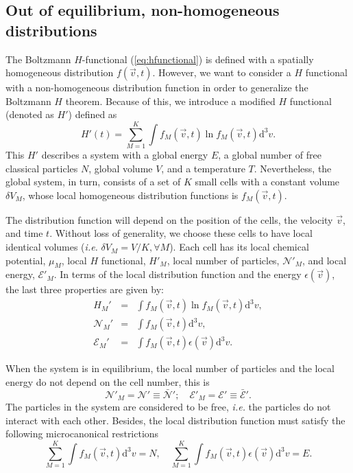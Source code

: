\subsection{Out of equilibrium, non-homogeneous distributions}

The Boltzmann $H$-functional (\ref{eq:hfunctional}) is defined with a spatially
homogeneous distribution $f(\vec{v},t)$. However, we want to consider a $H$
functional with a non-homogeneous distribution function in order to generalize
the Boltzmann $H$ theorem. Because of this, we introduce a modified $H$
functional (denoted as $H'$) defined as
%
\begin{equation}\label{eq:CH2}
   H'(t)=\sum_{M=1}^{K}\int f_M(\vec{v},t) \ln f_M(\vec{v},t)\mathrm{d}^3v.
\end{equation}
%
This $H'$ describes a system with a global energy $E$, a global number of free
classical particles $N$, global volume $V$, and a temperature $T$. Nevertheless,
the global system, in turn, consists of a set of $K$ small cells with a constant
volume $\delta V_M$, whose local homogeneous distribution functions is
$f_{M}(\vec{v},t)$.

The distribution function will depend on the position of the cells, the velocity
$\vec{v}$, and time $t$. Without loss of generality, we choose these cells to
have local identical volumes (\textit{i.e.} $\delta V_M = V/K, \forall M$).
Each cell has its local chemical potential, $\mu_M$, local
$H$ functional, $H'_M$, local number of particles, $\mathcal{N}'_M$, and local
energy, $\mathcal{E}'_M$. In terms of the local distribution 
function and the energy $\epsilon(\vec{v})$, the last three properties are
given by:
%
\begin{eqnarray}
    H_M' & = &  \int f_M(\vec{v},t) \ln f_{M}(\vec{v},t)
      \mathrm{d}^{3}v \label{Hcell},\nonumber\\
    \mathcal{N}_M' & = & \int f_{M}(\vec{v} ,t) \mathrm{d}^{3}v, \nonumber\\
    \mathcal{E}_M' & = & \int f_{M}(\vec{v},t)\epsilon(\vec{v}) \mathrm{d}^{3}v.
\end{eqnarray}
%

When the system is in equilibrium, the local number of particles and the local
energy do not depend on the cell number, this is
%
\begin{equation}
   \mathcal{N}'_M=\mathcal{N}'\equiv \bar{\mathcal{N}}';
   \quad\mathcal{E}'_M=\mathcal{E}'\equiv\bar{\mathcal{E}}'.
\end{equation}
%
The particles in the system are considered to be free, \textit{i.e.} the
particles do not interact with each other. Besides, the local distribution
function must satisfy the following microcanonical restrictions 
%
\begin{equation}\label{micro}
    \sum_{M=1}^{K}\int f_M(\vec{v},t)\mathrm{d}^3v =N,
    \quad\sum_{M=1}^{K}\int f_M(\vec{v},t)\epsilon(\vec{v})\mathrm{d}^3v=E.
\end{equation}
%

